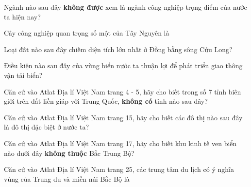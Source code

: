 \documentclass[11pt]{article}
\begin{document}
\begin{vnmultiplechoice}[title={\bf I. Các câu hỏi Địa lý}, keycolumns=3]
\begin{question} %
Ngành nào sau đây \textbf{không được} xem là ngành công nghiệp trọng điểm của nước ta hiện nay?
\datcot[2]
\bonpa
{}
{}
{}
{}
\end{question}

\begin{question} %
Cây công nghiệp quan trọng số một của Tây Nguyên là
\datcot
\bonpa
{}
{}
{}
{}
\end{question}

\begin{question} %
Loại đất nào sau đây chiếm diện tích lớn nhất ở Đồng bằng sông Cửu Long?
\datcot
\bonpa
{}
{}
{}
{}
\end{question}

\begin{question} %
Điều kiện nào sau đây của vùng biển nước ta thuận lợi để phát triển giao thông vận tải biển?
\datcot[4]
\bonpa
{}
{}
{}
{}
\end{question}
\begin{question} %
Căn cứ vào Atlat Địa lí Việt Nam trang 4 - 5, hãy cho biết trong số 7 tỉnh biên giới trên đất liền
giáp với Trung Quốc, \textbf{không có} tỉnh nào sau đây?
\datcot
\bonpa
{}
{}
{}
{}
\end{question}

\begin{question} %
Căn cứ vào Atlat Địa lí Việt Nam trang 15, hãy cho biết các đô thị nào sau đây là đô thị đặc biệt
ở nước ta?
\datcot
\bonpa
{}
{}
{}
{}
\end{question}

\begin{question} %
Căn cứ vào Atlat Địa lí Việt Nam trang 17, hãy cho biết khu kinh tế ven biển nào dưới đây
\textbf{không thuộc} Bắc Trung Bộ?
\datcot
\bonpa
{}
{}
{}
{}
\end{question}

\begin{question} %
Căn cứ vào Atlat Địa lí Việt Nam trang 25, các trung tâm du lịch có ý nghĩa vùng của Trung du
và miền núi Bắc Bộ là
\datcot
\bonpa
{}
{}
{}
{}
\end{question}

 \end{vnmultiplechoice}
\end{document}
